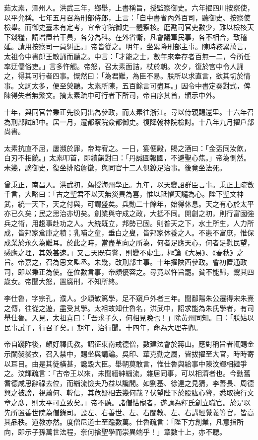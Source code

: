 \begin{pinyinscope}
茹太素，澤州人。洪武三年，鄉舉，上書稱旨，授監察御史。六年擢四川按察使，以平允稱。七年五月召為刑部侍郎，上言：「自中書省內外百司，聽御史、按察使檢舉。而御史臺未有定考，宜令守院御史一體察核。磨勘司官吏數少，難以檢核天下錢糧，請增置若干員，各分為科。在外省衛，凡會議軍民事，各不相合，致稽延。請用按察司一員糾正。」帝皆從之。明年，坐累降刑部主事。陳時務累萬言，太祖令中書郎王敏誦而聽之。中言：「才能之士，數年來幸存者百無一二，今所任率迂儒俗吏。」言多忤觸。帝怒，召太素面詰，杖於朝。次夕，復於宮中令人誦之，得其可行者四事。慨然曰：「為君難，為臣不易。朕所以求直言，欲其切於情事。文詞太多，便至熒聽。太素所陳，五百餘言可盡耳。」因令中書定奏對式，俾陳得失者無繁文。摘太素疏中可行者下所司，帝自序其首，頒示中外。

十年，與同官曾秉正先後同出為參政，而太素往浙江。尋以侍親賜還里。十六年召為刑部試郎中。居一月，遷都察院僉都御史。復降翰林院檢討。十八年九月擢戶部尚書。

太素抗直不屈，屢瀕於罪，帝時宥之。一日，宴便殿，賜之酒曰：「金盃同汝飲，白刃不相饒。」太素叩首，即續韻對曰：「丹誠圖報國，不避聖心焦。」帝為惻然。未幾，謫御史，復坐排陷詹徽，與同官十二人俱鐐足治事。後竟坐法死。

曾秉正，南昌人。洪武初，薦授海州學正。九年，以天變詔群臣言事。秉正上疏數千言，大略曰：「古之聖君不以天無災異為喜，惟以祗懼天譴為心。陛下聖文神武，統一天下，天之付與，可謂盛矣。兵動二十餘年，始得休息。天之有心於太平亦已久矣；民之思治亦切矣。創業與守成之政，大抵不同。開創之初，則行富國強兵之術，用趨事赴功之人。大統既立，邦勢已固。則普天之下，水土所生，人力所成，皆邦家倉庫之積；乳哺之童，垂白之叟，皆邦家休養之人。不患不富庶，惟保成業於永久為難耳。於此之時，當盡革向之所為，何者足應天心，何者足慰民望，感應之理，其效甚速。」又言天既有警，則變不虛生。極論《大易》、《春秋》之旨。帝嘉之，召為思文監丞。未幾，改刑部主事。十年擢陜西參政。會初置通政司，即以秉正為使。在位數言事，帝頗優容之。尋竟以忤旨罷。貧不能歸，鬻其四歲女。帝聞大怒，置腐刑，不知所終。

李仕魯，字宗孔，濮人。少穎敏篤學，足不窺戶外者三年。聞鄱陽朱公遷得宋朱熹之傳，往從之遊，盡受其學。太祖故知仕魯名，洪武中，詔求能為朱氏學者，有司舉仕魯。入見，太祖喜曰：「吾求子久，何相見晚也！」除黃州同知。曰：「朕姑以民事試子，行召子矣。」期年，治行聞。十四年，命為大理寺卿。

帝自踐阼後，頗好釋氏教。詔征東南戒德僧，數建法會於蔣山。應對稱旨者輒賜金示闌袈裟衣，召入禁中，賜坐與講論。吳印、華克勤之屬，皆拔擢至大官，時時寄以耳目。由是其徒橫甚，讒毀大臣。舉朝莫敢言，惟仕魯與給事中陳汶輝相繼爭之。汶輝疏言：「古帝王以來，未聞縉紳緇流，雜居同事，可以相濟者也。今勳舊耆德咸思辭祿去位，而緇流憸夫乃益以讒間。如劉基、徐達之見猜，李善長、周德興之被謗，視蕭何、韓信，其危疑相去幾何哉？伏望陛下於股肱心膂，悉取德行文章之彥，則太平可立致矣。」帝不聽。諸僧怙寵者，遂請為釋氏創立職官。於是以先所置善世院為僧錄司。設左、右善世、左、右闡教、左、右講經覺義等官，皆高其品秩。道教亦然。度僧尼道士至踰數萬。仕魯疏言：「陛下方創業，凡意指所向，即示子孫萬世法程，奈何捨聖學而崇異端乎！」章數十上，亦不聽。


\end{pinyinscope}
